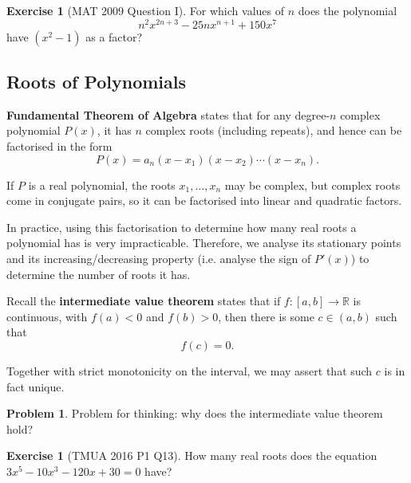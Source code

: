 \documentclass[11pt]{article}
\theoremstyle{definition}
\newtheorem{example}[theorem]{Exercise}
\newtheorem{problem}[theorem]{Problem}
\theoremstyle{remark}
\newcommand{\pqty}[1]{\left(#1\right)}
\newcommand{\ccintv}[2]{[#1,#2]}
\newcommand{\oointv}[2]{(#1,#2)}
\newcommand{\functiondomain}[3]{#1:#2\to #3}
\newcommand{\RR}{\mathbb{R}}
\begin{document}
\begin{example}[MAT 2009 Question I]\label{tmua-2-unit-008}
    For which values of \(n\) does the polynomial
    \[
        n^2 x^{2n + 3} - 25 n x^{n + 1} + 150 x^7
    \]
    have \(\pqty{x^2 - 1}\) as a factor?
\end{example}

\subsection{Roots of Polynomials}\label{tmua-2-subsection-003}
\textbf{Fundamental Theorem of Algebra} states that for any degree-\(n\) complex polynomial \(P\pqty{x}\), it has \(n\) complex roots (including repeats), and hence can be factorised in the form
\[
    P\pqty{x} = a_n \pqty{x - x_1} \pqty{x - x_2} \cdots \pqty{x - x_n}.
\]

If \(P\) is a real polynomial, the roots \(x_1, \ldots, x_n\) may be complex, but complex roots come in conjugate pairs, so it can be factorised into linear and quadratic factors.

In practice, using this factorisation to determine how many real roots a polynomial has is very impracticable. Therefore, we analyse its stationary points and its increasing/decreasing property (i.e. analyse the sign of \(P'\pqty{x}\)) to determine the number of roots it has.

Recall the \textbf{intermediate value theorem} states that if \(\functiondomain{f}{\ccintv{a}{b}}{\RR}\) is continuous, with \(f\pqty{a} < 0\) and \(f\pqty{b} > 0\), then there is some \(c \in \oointv{a}{b}\) such that
\[
    f\pqty{c} = 0.
\]

Together with strict monotonicity on the interval, we may assert that such \(c\) is in fact unique.

\begin{problem}\label{tmua-2-unit-009}
    Problem for thinking: why does the intermediate value theorem hold?
\end{problem}

\begin{example}[TMUA 2016 P1 Q13]\label{tmua-2-unit-010}
    How many real roots does the equation \(3 x^5 - 10 x^3 - 120 x + 30 = 0\) have?
\end{example}
\end{document}
